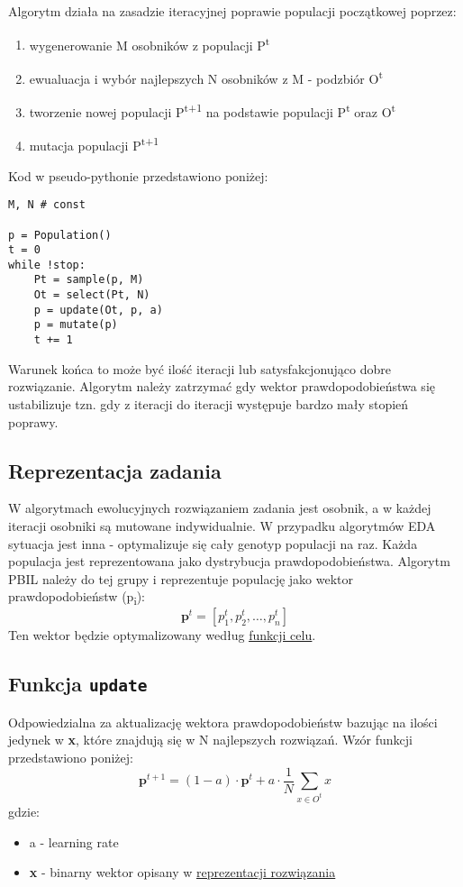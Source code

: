 \documentclass[11pt]{article}
\begin{document}
Algorytm działa na zasadzie iteracyjnej poprawie populacji początkowej poprzez:
\begin{enumerate}
\item wygenerowanie M osobników z populacji P\textsuperscript{t}
\item ewualuacja i wybór najlepszych N osobników z M - podzbiór O\textsuperscript{t}
\item tworzenie nowej populacji P\textsuperscript{t+1} na podstawie populacji P\textsuperscript{t} oraz O\textsuperscript{t}
\item mutacja populacji P\textsuperscript{t+1}
\end{enumerate}
Kod w pseudo-pythonie przedstawiono poniżej:
\begin{verbatim}
M, N # const

p = Population()
t = 0
while !stop:
    Pt = sample(p, M)
    Ot = select(Pt, N)
    p = update(Ot, p, a)
    p = mutate(p)
    t += 1
\end{verbatim}

Warunek końca to może być ilość iteracji lub satysfakcjonująco dobre rozwiązanie. Algorytm należy zatrzymać gdy wektor prawdopodobieństwa się ustabilizuje tzn. gdy z iteracji do iteracji występuje bardzo mały stopień poprawy.
\subsection{Reprezentacja zadania}
\label{sec:org0be5ed0}
W algorytmach ewolucyjnych rozwiązaniem zadania jest osobnik, a w każdej iteracji osobniki są mutowane indywidualnie. W przypadku algorytmów EDA sytuacja jest inna - optymalizuje się cały genotyp populacji na raz. Każda populacja jest reprezentowana jako dystrybucja prawdopodobieństwa. Algorytm PBIL należy do tej grupy i reprezentuje populację jako wektor prawdopodobieństw (p\textsubscript{i}):
\[
        \boldsymbol{p}^t = [p_1^t, p_2^t, \dots, p_n^t]
\]
Ten wektor będzie optymalizowany według \uline{\hyperref[sec:orgfed3d26]{funkcji celu}}.
\subsection{Funkcja \texttt{update}}
\label{sec:orga4c09fd}
Odpowiedzialna za aktualizację wektora prawdopodobieństw bazując na ilości jedynek w \textbf{x}, które znajdują się w N najlepszych rozwiązań. Wzór funkcji przedstawiono poniżej:
\[
        \boldsymbol{p}^{t+1}=(1-a) \cdot \boldsymbol{p}^t + a \cdot \frac{1}{N} \sum_{x \in O^t}x
\]
gdzie:
\begin{itemize}
\item a - learning rate
\item \textbf{x} - binarny wektor opisany w \hyperref[sec:org7c490b7]{\uline{reprezentacji rozwiązania}}
\end{itemize}
\end{document}
